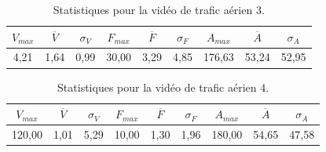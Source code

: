 \begin{appendices}
	
\begin{table}
	\centering
	\begin{tabular}{c c c c c c c c c}
		$V_{max}$	& $\overline{V}$	& $\sigma_{V}$	& $F_{max}$	& $\overline{F}$	& $\sigma_{F}$	& $A_{max}$	& $\overline{A}$	& $\sigma_{A}$	\bigstrut[b] \\ \hline

		4,21		& 1,64				& 0,99			& 30,00		& 3,29				& 4,85			& 176,63	& 53,24				& 52,95			\bigstrut[t] \\
	\end{tabular}
	\caption[Statistiques pour la vidéo  de trafic aérien 3]{Statistiques pour la vidéo  de trafic aérien 3.}
	\label{tab:hkg_stats}
\end{table}



\begin{table}
	\centering
	\begin{tabular}{c c c c c c c c c}
		$V_{max}$	& $\overline{V}$	& $\sigma_{V}$	& $F_{max}$	& $\overline{F}$	& $\sigma_{F}$	& $A_{max}$	& $\overline{A}$	& $\sigma_{A}$	\bigstrut[b] \\ \hline

		120,00		& 1,01				& 5,29			& 10,00		& 1,30				& 1,96			& 180,00	& 54,65				& 47,58			\bigstrut[t] \\
	\end{tabular}
	\caption[Statistiques pour la vidéo  de trafic aérien 4]{Statistiques pour la vidéo de trafic aérien 4.}
	\label{tab:flightradar2a_stats}
\end{table}






\end{appendices}
